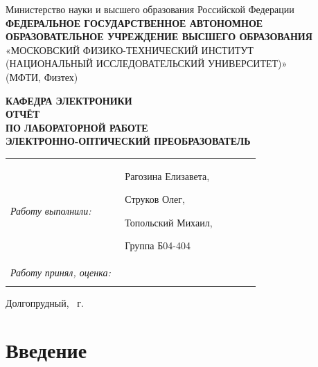 \documentclass[12pt, a4paper]{article}
\begin{document}

\begin{titlepage}
\thispagestyle{empty}

\begin{center}
\small
Министерство науки и высшего образования Российской Федерации\\[2mm]
\textbf{ФЕДЕРАЛЬНОЕ ГОСУДАРСТВЕННОЕ АВТОНОМНОЕ
ОБРАЗОВАТЕЛЬНОЕ УЧРЕЖДЕНИЕ ВЫСШЕГО ОБРАЗОВАНИЯ}\\[1mm]
«МОСКОВСКИЙ ФИЗИКО-ТЕХНИЧЕСКИЙ ИНСТИТУТ\\
(НАЦИОНАЛЬНЫЙ ИССЛЕДОВАТЕЛЬСКИЙ УНИВЕРСИТЕТ)»\\
(МФТИ, Физтех)
\end{center}

\vspace{18mm}

\begin{center}
\large \textbf{КАФЕДРА ЭЛЕКТРОНИКИ}\\[10mm]
\Large \textbf{ОТЧЁТ}\\[2mm]
\large \textbf{ПО ЛАБОРАТОРНОЙ РАБОТЕ}\\[14mm]
\Large \textbf{ЭЛЕКТРОННО-ОПТИЧЕСКИЙ ПРЕОБРАЗОВАТЕЛЬ}
\end{center}

\vfill

\noindent
\begin{tabular}{@{}p{0.44\linewidth}p{0.52\linewidth}@{}}
\textit{Работу выполнили:} & Рагозина Елизавета,

Струков Олег,

Топольский Михаил,

Группа Б04-404 \\[8mm]

\textit{Работу принял, оценка:} & \\[3mm]
 \\
\end{tabular}


\vspace{12mm}

\begin{center}
\small Долгопрудный, \the\year{}~г.
\end{center}

\end{titlepage}




\newpage
{}
\section*{Введение}
\end{document}
